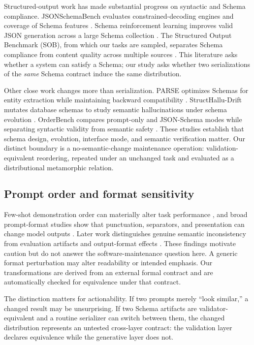 \documentclass[11pt,a4paper]{article}
\begin{document}
Structured-output work has made substantial progress on syntactic and Schema compliance. JSONSchemaBench evaluates constrained-decoding engines and coverage of Schema features \citep{geng2025jsonschemabench}. Schema reinforcement learning improves valid JSON generation across a large Schema collection \citep{lu2025schemarl}. The Structured Output Benchmark (SOB), from which our tasks are sampled, separates Schema compliance from content quality across multiple sources \citep{singh2026sob}. This literature asks whether a system can satisfy a Schema; our study asks whether two serializations of the \emph{same} Schema contract induce the same distribution.

Other close work changes more than serialization. PARSE optimizes Schemas for entity extraction while maintaining backward compatibility \citep{shrimal2025parse}. StructHallu-Drift mutates database schemas to study semantic hallucinations under schema evolution \citep{hasan2026structhallu}. OrderBench compares prompt-only and JSON-Schema modes while separating syntactic validity from semantic safety \citep{li2026orderbench}. These studies establish that schema design, evolution, interface mode, and semantic verification matter. Our distinct boundary is a no-semantic-change maintenance operation: validation-equivalent reordering, repeated under an unchanged task and evaluated as a distributional metamorphic relation.

\subsection{Prompt order and format sensitivity}
Few-shot demonstration order can materially alter task performance \citep{lu2022ordered}, and broad prompt-format studies show that punctuation, separators, and presentation can change model outputs \citep{sclar2024format}. Later work distinguishes genuine semantic inconsistency from evaluation artifacts and output-format effects \citep{kang2025format,hua2025artifact,ravikumar2026lost}. These findings motivate caution but do not answer the software-maintenance question here. A generic format perturbation may alter readability or intended emphasis. Our transformations are derived from an external formal contract and are automatically checked for equivalence under that contract.

The distinction matters for actionability. If two prompts merely ``look similar,'' a changed result may be unsurprising. If two Schema artifacts are validator-equivalent and a routine serializer can switch between them, the changed distribution represents an untested cross-layer contract: the validation layer declares equivalence while the generative layer does not.
\end{document}
